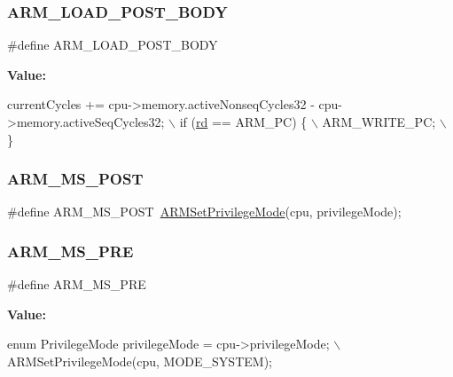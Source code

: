 \subsubsection{\texorpdfstring{A\+R\+M\+\_\+\+L\+O\+A\+D\+\_\+\+P\+O\+S\+T\+\_\+\+B\+O\+DY}{ARM\_LOAD\_POST\_BODY}}
{\footnotesize\ttfamily \#define A\+R\+M\+\_\+\+L\+O\+A\+D\+\_\+\+P\+O\+S\+T\+\_\+\+B\+O\+DY}

{\bfseries Value\+:}
\begin{DoxyCode}
currentCycles += cpu->memory.activeNonseqCycles32 - cpu->memory.activeSeqCycles32; \(\backslash\)
    if (\mbox{\hyperlink{isa-arm_8c_a555541ce18ed9b5fad657a06b22cb465}{rd}} == ARM\_PC) \{ \(\backslash\)
        ARM\_WRITE\_PC; \(\backslash\)
    \}
\end{DoxyCode}
\mbox{\label{isa-arm_8c_a96d347cafe10b558e730777641cab389}} 
\subsubsection{\texorpdfstring{A\+R\+M\+\_\+\+M\+S\+\_\+\+P\+O\+ST}{ARM\_MS\_POST}}
{\footnotesize\ttfamily \#define A\+R\+M\+\_\+\+M\+S\+\_\+\+P\+O\+ST~\mbox{\hyperlink{isa-arm_8c_ac85f42234737e9423c66613a87824701}{A\+R\+M\+Set\+Privilege\+Mode}}(cpu, privilege\+Mode);}

\mbox{\label{isa-arm_8c_ab421d83d04b870edf4883223176566b9}} 
\subsubsection{\texorpdfstring{A\+R\+M\+\_\+\+M\+S\+\_\+\+P\+RE}{ARM\_MS\_PRE}}
{\footnotesize\ttfamily \#define A\+R\+M\+\_\+\+M\+S\+\_\+\+P\+RE}

{\bfseries Value\+:}
\begin{DoxyCode}
\textcolor{keyword}{enum} PrivilegeMode privilegeMode = cpu->privilegeMode; \(\backslash\)
    ARMSetPrivilegeMode(cpu, MODE\_SYSTEM);
\end{DoxyCode}
\mbox{\label{isa-arm_8c_a11eedb3f96fee00a17773471aa6f2b18}} 
